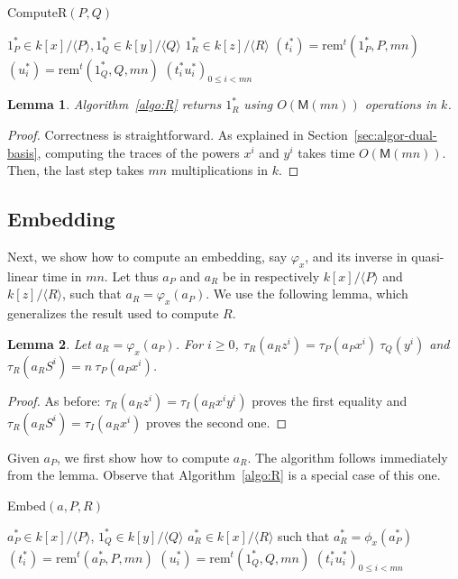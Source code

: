 \documentclass[12pt]{article}
\def\M {\ensuremath{\mathsf{M}}}
\def\rem {\ensuremath{\mathrm{rem}}}
\newcommand{\ang}[1]{\langle#1\rangle}
\newtheorem{Lemma}{Lemma}
\begin{document}
\begin{algorithm}[H]
  \caption{ComputeR$(P, Q)$}
  \begin{algorithmic}[1]
    \REQUIRE $1_P^\ast\in k[x]/\ang{P}, 1_Q^\ast\in k[y]/\ang{Q}$
    \ENSURE $1_R^\ast \in k[z]/\ang{R}$
    \STATE $(t_i^\ast) = \rem^t(1_P^\ast,P,mn)$
    \STATE $(u_i^\ast) = \rem^t(1_Q^\ast,Q,mn)$
    \RETURN $(t_i^\ast u_i^\ast)_{0 \le i < mn}$
  \end{algorithmic}
  \label{algo:R}
\end{algorithm}

\begin{Lemma}
  \label{lemma:lift}
  Algorithm~\ref{algo:R} returns $1_R^\ast$ using $O(\M(mn))$ operations in
  $k$.
\end{Lemma}
\begin{proof}
  Correctness is straightforward.  As explained in
  Section~\ref{sec:algor-dual-basis}, computing the traces of the
  powers $x^i$ and $y^i$ takes time $O(\M(mn))$. Then, the last step
  takes $mn$ multiplications in $k$.
\end{proof}



\subsection{Embedding} 

Next, we show how to compute an embedding, say $\varphi_x$, and its
inverse in quasi-linear time in $mn$. Let thus $a_P$ and $a_R$ be in
respectively $k[x]/\ang{P}$ and $k[z]/\langle R \rangle$, such that
$a_R=\varphi_x(a_P)$. We use the following lemma, which generalizes
the result used to compute $R$.

\begin{Lemma}\label{lemma:traces:PQR}
  Let $a_R=\varphi_x(a_P)$. For $i \ge 0$, $\tau_R(a_Rz^i) =
  \tau_P(a_P x^i) \ \tau_Q(y^i)$ and $\tau_R(a_R S^i) = n\ \tau_P(a_P
  x^i)$.
\end{Lemma}
\begin{proof}
As before: $\tau_R(a_R z^i) = \tau_I(a_R x^i y^i)$ proves the first
equality and $\tau_R(a_R S^i) = \tau_I(a_R x^i)$ proves the second one.
\end{proof}

Given $a_P$, we first show how to compute $a_R$. The algorithm follows
immediately from the lemma. Observe that Algorithm~\ref{algo:R} is a
special case of this one.

\begin{algorithm}[H]
  \caption{Embed$(a,P,R)$}
  \begin{algorithmic}[1]
    \REQUIRE $a_P^\ast\in k[x]/\ang{P}$, $1_Q^\ast\in k[y]/\ang{Q}$
    \ENSURE $a_R^\ast\in k[x]/\ang{R}$ such that $a_R^\ast=\phi_x(a_P^\ast)$
    \STATE $(t_i^\ast) = \rem^t(a_P^\ast,P,mn)$
    \STATE $(u_i^\ast) = \rem^t(1_Q^\ast,Q,mn)$
    \RETURN $(t_i^\ast u_i^\ast)_{0 \le i < mn}$
  \end{algorithmic}
  \label{algo:embed}
\end{algorithm}
\end{document}
